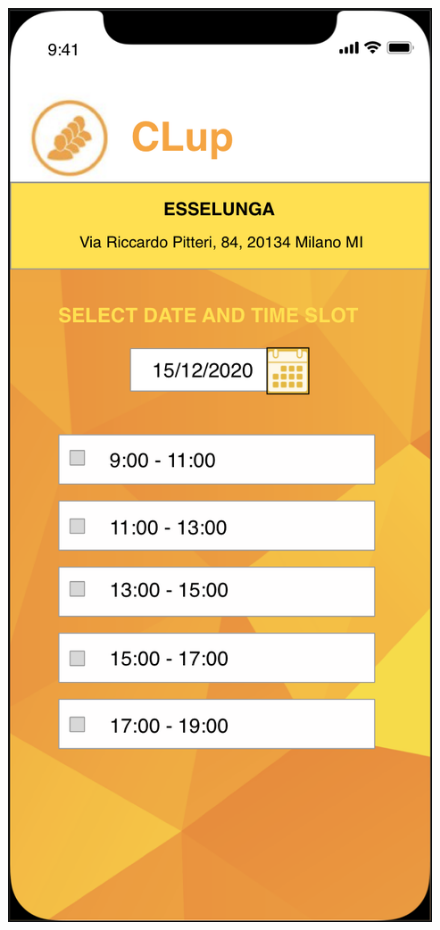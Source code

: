 \documentclass{article}
\begin{document}
\begin{figure}[H]
\begin{minipage}[b]{0.4\textwidth}
\centering
\includegraphics[width=\textwidth]{Timeslot.png}

\end{minipage}
\end{figure}
\end{document}
